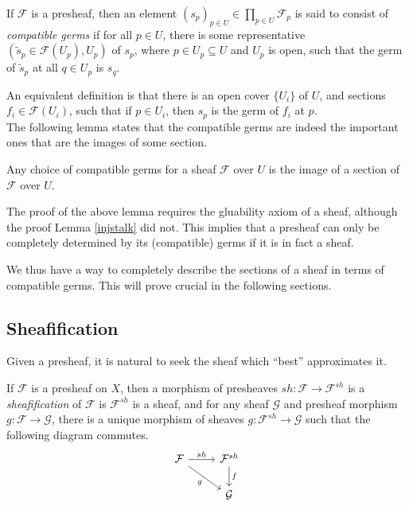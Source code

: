 \documentclass[11pt,openany]{book} %
\begin{document}
\begin{definition}
If $\mathcal{F}$ is a presheaf, then an element $(s_p)_{p \in U} \in \prod_{p \in U} \mathcal{F}_p$ is said to consist of \emph{compatible germs} if for all $p \in U$, there is some representative $(\tilde{s}_p \in \mathcal{F}(U_p), U_p)$ of $s_p$, where $p \in U_p \subseteq U$ and $U_p$ is open, such that the germ of $\tilde{s}_p$ at all $q \in U_p$ is $s_q$.
\end{definition}

An equivalent definition is that there is an open cover $\{U_i\}$ of $U$, and sections $f_i \in \mathcal{F}(U_i)$, such that if $p \in U_i$, then $s_p$ is the germ of $f_i$ at $p$.\\

The following lemma states that the compatible germs are indeed the important ones that are the images of some section.\\

\begin{lemma}
Any choice of compatible germs for a sheaf $\mathcal{F}$ over $U$ is the image of a section of $\mathcal{F}$ over $U$.
\end{lemma}

\begin{remark}
The proof of the above lemma requires the gluability axiom of a sheaf, although the proof Lemma \ref{injstalk} did not. This implies that a presheaf can only be completely determined by its (compatible) germs if it is in fact a sheaf.
\end{remark}

We thus have a way to completely describe the sections of a sheaf in terms of compatible germs. This will prove crucial in the following sections.



\subsection{Sheafification}
Given a presheaf, it is natural to seek the sheaf which ``best'' approximates it.\\

\begin{definition}
If $\mathcal{F}$ is a presheaf on $X$, then a morphism of presheaves $sh : \mathcal{F} \to \mathcal{F}^{sh}$ is a \emph{sheafification} of $\mathcal{F}$ is $\mathcal{F}^{sh}$ is a sheaf, and for any sheaf $\mathcal{G}$ and presheaf morphism $g : \mathcal{F} \to \mathcal{G}$, there is a unique morphism of sheaves $g : \mathcal{F}^{sh} \to \mathcal{G}$ such that the following diagram commutes.
\[
\begin{tikzcd}
\mathcal{F} \arrow[r, "sh"] \arrow[rd, "g", swap] & \mathcal{F}^{sh} \arrow[d, "f"] \\
& \mathcal{G}
\end{tikzcd}
\]
\end{definition}
\end{document}
